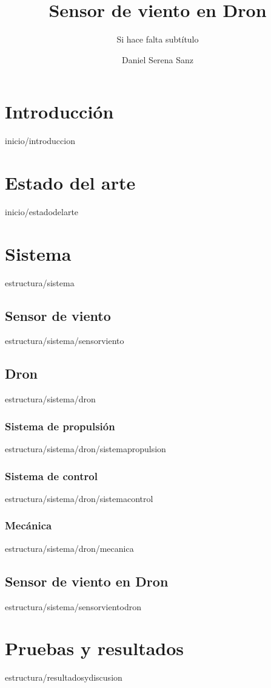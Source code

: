 \documentclass[epsbased,lof,loe,copyright,final,printable,covers,extendedindex,firstnumbered,tfg,gnuplot]{tfgtfmthesisuam}
\title{Sensor de viento en Dron}
\subtitle{Si hace falta subtítulo}
\author{Daniel Serena Sanz}
\begin{document}
\chapter{Introducción\label{CAP:INTRODUCCION}}{inicio/introduccion}
\chapter{Estado del arte\label{CAP:ESTADODELARTE}}{inicio/estadodelarte}
\chapter{Sistema\label{CAP:SISTEMA}}{estructura/sistema}

	\section{Sensor de viento\label{SEC:SENSORVIENTO}}{estructura/sistema/sensorviento}

	\section{Dron\label{SEC:DRON}}{estructura/sistema/dron}
		\subsection{Sistema de propulsión\label{SS:SISTPROPULSION}}{estructura/sistema/dron/sistemapropulsion}
		\subsection{Sistema de control\label{SS:SISTCONTROL}}{estructura/sistema/dron/sistemacontrol}
		\subsection{Mecánica\label{SS:MECANICA}}{estructura/sistema/dron/mecanica}
		
	\section{Sensor de viento en Dron\label{SEC:SENSORVIENTODRON}}{estructura/sistema/sensorvientodron}

\chapter{Pruebas y resultados\label{CAP:RESEXPYDISC}}{estructura/resultadosydiscusion}
\end{document}
